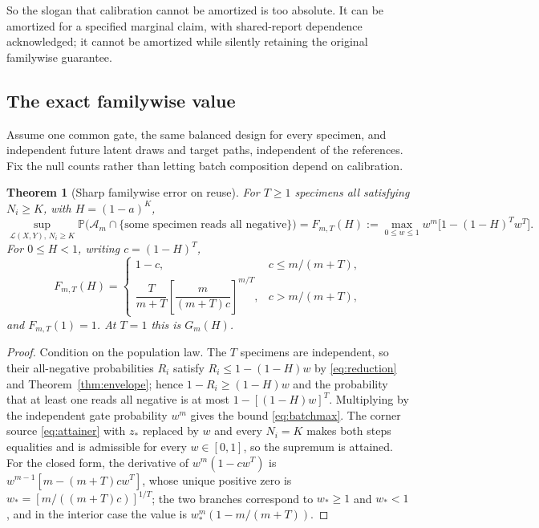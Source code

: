 \documentclass[11pt]{article}
\newtheorem{theorem}{Theorem}[section]
\theoremstyle{remark}\newtheorem{remark}[theorem]{Remark}
\newcommand{\Prob}{\mathbb P}
\begin{document}
So the slogan that calibration cannot be amortized is too absolute. It can be
amortized for a specified marginal claim, with shared-report dependence
acknowledged; it cannot be amortized while silently retaining the original
familywise guarantee.

\subsection{The exact familywise value}
Assume one common gate, the same balanced design for every specimen, and
independent future latent draws and target paths, independent of the references.
Fix the null counts rather than letting batch composition depend on calibration.

\begin{theorem}[Sharp familywise error on reuse]\label{thm:batch}
For $T\ge1$ specimens all satisfying $N_i\ge K$, with $H=(1-a)^K$,
\begin{equation}\label{eq:batchmax}
\sup_{\mathcal L(X,Y),\,N_i\ge K}\Prob\big(\mathcal A_m\cap\{\text{some
specimen reads all negative}\}\big)
=F_{m,T}(H):=\max_{0\le w\le1}w^m\big[1-(1-H)^Tw^T\big].
\end{equation}
For $0\le H<1$, writing $c=(1-H)^T$,
\begin{equation}\label{eq:batchform}
F_{m,T}(H)=
\begin{cases}
1-c,& c\le m/(m+T),\\[2mm]
\dfrac{T}{m+T}\left[\dfrac{m}{(m+T)c}\right]^{m/T},& c>m/(m+T),
\end{cases}
\end{equation}
and $F_{m,T}(1)=1$. At $T=1$ this is $G_m(H)$.
\end{theorem}
\begin{proof}
Condition on the population law. The $T$ specimens are independent, so their
all-negative probabilities $R_i$ satisfy $R_i\le1-(1-H)w$ by
\eqref{eq:reduction} and Theorem~\ref{thm:envelope}; hence
$1-R_i\ge(1-H)w$ and the probability that at least one reads all negative is at
most $1-[(1-H)w]^T$. Multiplying by the independent gate probability $w^m$ gives
the bound \eqref{eq:batchmax}. The corner source \eqref{eq:attainer} with
$z_*$ replaced by $w$ and every $N_i=K$ makes both steps equalities and is
admissible for every $w\in[0,1]$, so the supremum is attained. For the closed
form, the derivative of $w^m(1-cw^T)$ is $w^{m-1}[m-(m+T)cw^T]$, whose unique
positive zero is $w_*=[m/((m+T)c)]^{1/T}$; the two branches correspond to
$w_*\ge1$ and $w_*<1$, and in the interior case the value is
$w_*^m(1-m/(m+T))$.
\end{proof}
\end{document}
